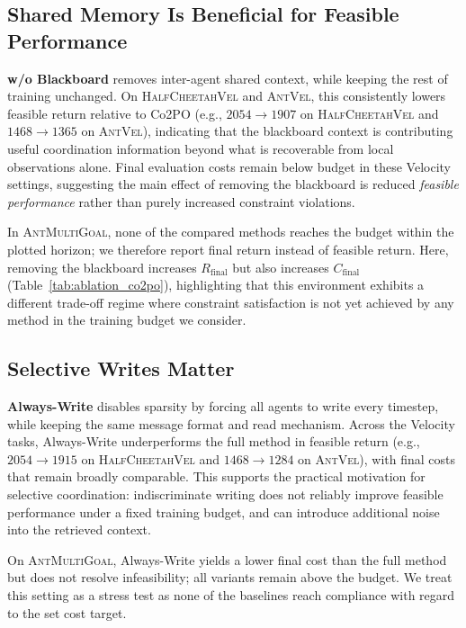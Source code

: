 \documentclass{article}
\theoremstyle{plain}
\theoremstyle{definition}
\theoremstyle{remark}
\begin{document}
\subsection{Shared Memory Is Beneficial for Feasible Performance}
\label{sec:ablate-blackboard}

\textbf{w/o Blackboard} removes inter-agent shared context, while keeping the rest of training unchanged.
On \textsc{HalfCheetahVel} and \textsc{AntVel}, this consistently lowers feasible return relative to Co2PO (e.g., $2054\!\rightarrow\!1907$ on \textsc{HalfCheetahVel} and $1468\!\rightarrow\!1365$ on \textsc{AntVel}), indicating that the blackboard context is contributing useful coordination information beyond what is recoverable from local observations alone.
Final evaluation costs remain below budget in these Velocity settings, suggesting the main effect of removing the blackboard is reduced \emph{feasible performance} rather than purely increased constraint violations.

In \textsc{AntMultiGoal}, none of the compared methods reaches the budget within the plotted horizon; we therefore report final return instead of feasible return.
Here, removing the blackboard increases $R_{\mathrm{final}}$ but also increases $C_{\mathrm{final}}$ (Table~\ref{tab:ablation_co2po}), highlighting that this environment exhibits a different trade-off regime where constraint satisfaction is not yet achieved by any method in the training budget we consider.

\subsection{Selective Writes Matter}
\label{sec:ablate-always-write}

\textbf{Always-Write} disables sparsity by forcing all agents to write every timestep, while keeping the same message format and read mechanism.
Across the Velocity tasks, Always-Write underperforms the full method in feasible return (e.g., $2054\!\rightarrow\!1915$ on \textsc{HalfCheetahVel} and $1468\!\rightarrow\!1284$ on \textsc{AntVel}), with final costs that remain broadly comparable.
This supports the practical motivation for selective coordination: indiscriminate writing does not reliably improve feasible performance under a fixed training budget, and can introduce additional noise into the retrieved context.

On \textsc{AntMultiGoal}, Always-Write yields a lower final cost than the full method but does not resolve infeasibility; all variants remain above the budget.
We treat this setting as a stress test as none of the baselines reach compliance with regard to the set cost target.
\end{document}
